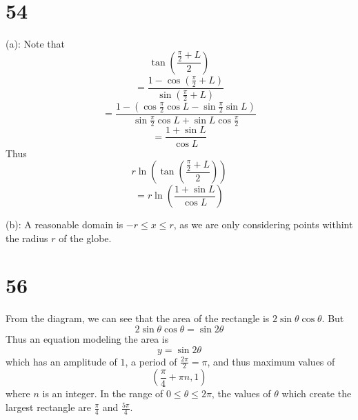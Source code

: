 \documentclass{article}
\theoremstyle{definition}
\newcommand{\?}{\stackrel{?}{=}}
\begin{document}
\section*{54}
(a): Note that
\[ \tan\left(\dfrac{\frac{\pi}{2}+L}{2}\right) \]
\[ =\dfrac{1-\cos(\frac{\pi}{2}+L)}{\sin(\frac{\pi}{2}+L)} \]
\[ =\frac{1-(\cos\frac{\pi}{2}\cos L-\sin\frac{\pi}{2}\sin L)}{\sin\frac{\pi}{2}\cos L+\sin L\cos\frac{\pi}{2}} \]
\[ =\frac{1+\sin L}{\cos L} \]
Thus
\[ r\ln\left(\tan\left(\dfrac{\frac{\pi}{2}+L}{2}\right)\right) \]
\[ =r\ln\left(\frac{1+\sin L}{\cos L}\right) \]


(b): A reasonable domain is $-r\le x\le r$, as we are only considering points withint the radius $r$ of the globe.

\section*{56}
From the diagram, we can see that the area of the rectangle is $2\sin\theta\cos\theta$. But
\[ 2\sin\theta\cos\theta=\sin 2\theta \] Thus an equation modeling the area is
\[ y=\sin 2\theta \]
which has an amplitude of $1$, a period of $\frac{2\pi}{2}=\pi$, and thus maximum values of
\[ (\frac{\pi}{4}+\pi n,1) \] where $n$ is an integer. In the range of $0\le\theta\le 2\pi$, the values of $\theta$ which create the largest rectangle are
$\frac{\pi}{4}$ and $\frac{5\pi}{4}$.
\end{document}
